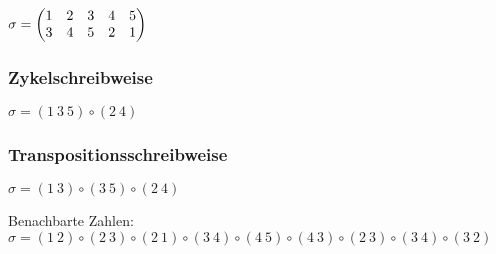 $\displaystyle \sigma = \begin{pmatrix} 1 & 2 & 3 & 4 & 5 \\ 3 & 4 & 5 & 2 & 1 \end{pmatrix}$

\subsubsection*{Zykelschreibweise}
$\sigma = (1~3~5) \circ (2~4)$

\subsubsection*{Transpositionsschreibweise}
$\sigma = (1~3) \circ (3~5) \circ (2~4)$

Benachbarte Zahlen: \\
$\sigma = (1~2) \circ (2~3) \circ (2~1) \circ (3~4) \circ (4~5) \circ (4~3) \circ (2~3) \circ (3~4) \circ (3~2)$

